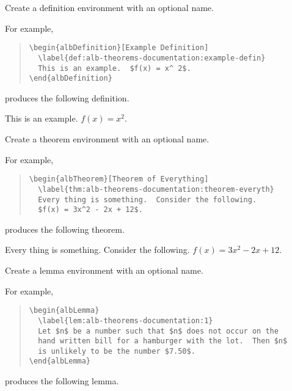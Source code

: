 \documentclass[11pt,a4paper,oneside,titlepage]{alb-latex}
\begin{document}
\begin{description}
\item[] Create a definition
  environment with an optional name.

  For example,
  \begin{quote}
\begin{verbatim}
\begin{albDefinition}[Example Definition]
  \label{def:alb-theorems-documentation:example-defin}
  This is an example.  $f(x) = x^ 2$.
\end{albDefinition}
\end{verbatim}
  \end{quote}
  produces the following definition.

  \begin{albDefinition}
    \label{def:alb-theorems-documentation:example-defin}
    This is an example.  $f(x) = x^ 2$.
  \end{albDefinition}

\item[] Create a theorem
  environment with an optional name.

  For example,
  \begin{quote}
\begin{verbatim}
\begin{albTheorem}[Theorem of Everything]
  \label{thm:alb-theorems-documentation:theorem-everyth}
  Every thing is something.  Consider the following.
  $f(x) = 3x^2 - 2x + 12$.
\end{verbatim}
  \end{quote}
  produces the following theorem.

  \begin{albTheorem}
    \label{thm:alb-theorems-documentation:theorem-everyth}
    Every thing is something.  Consider the following.  $f(x) = 3x^2 -
    2x + 12$.
  \end{albTheorem}

\item[] Create a lemma environment
  with an optional name.

  For example,
  \begin{quote}
\begin{verbatim}
\begin{albLemma}
  \label{lem:alb-theorems-documentation:1}
  Let $n$ be a number such that $n$ does not occur on the
  hand written bill for a hamburger with the lot.  Then $n$
  is unlikely to be the number $7.50$.
\end{albLemma}
\end{verbatim}
  \end{quote}
  produces the following lemma.


\end{description}
\end{document}
